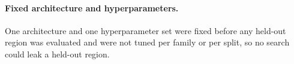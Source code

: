 \paragraph{Fixed architecture and hyperparameters.}
One architecture and one hyperparameter set were fixed before any held-out
region was evaluated and were not tuned per family or per split, so no search
could leak a held-out region.
